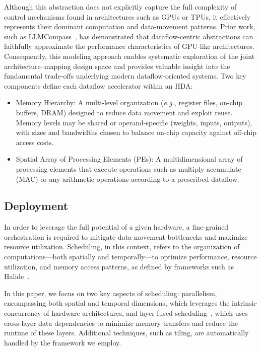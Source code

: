 \documentclass[lettersize,journal]{IEEEtran}
\begin{document}
Although this abstraction does not explicitly capture the full complexity of control mechanisms found in architectures such as GPUs or TPUs, it effectively represents their dominant computation and data-movement patterns. Prior work, such as LLMCompass~\cite{LLMCompass}, has demonstrated that dataflow-centric abstractions can faithfully approximate the performance characteristics of GPU-like architectures. Consequently, this modeling approach enables systematic exploration of the joint architecture–mapping design space and provides valuable insight into the fundamental trade-offs underlying modern dataflow-oriented systems.
Two key components define each dataflow accelerator within an HDA:
\begin{itemize}
    \item Memory Hierarchy: A multi-level organization (\emph{e.g.}, register files, on-chip buffers, DRAM) designed to reduce data movement and exploit reuse. Memory levels may be shared or operand-specific (weights, inputs, outputs), with sizes and bandwidths chosen to balance on-chip capacity against off-chip access costs.
    \item Spatial Array of Processing Elements (PEs): A multidimensional array of processing elements that execute operations such as multiply-accumulate (MAC) or any arithmetic operations according to a prescribed dataflow.
\end{itemize}

\subsection{Deployment}
In order to leverage the full potential of a given hardware, a fine-grained orchestration is required to mitigate data-movement bottlenecks and maximize resource utilization. Scheduling, in this context, refers to the organization of computations—both spatially and temporally—to optimize performance, resource utilization, and memory access patterns, as defined by frameworks such as Halide~\cite{halide2016}.

In this paper, we focus on two key aspects of scheduling: parallelism, encompassing both spatial and temporal dimensions, which leverages the intrinsic concurrency of hardware architectures, and layer-fused scheduling~\cite{alwani2016layerfused}, which uses cross-layer data dependencies to minimize memory transfers and reduce the runtime of these layers. Additional techniques, such as tiling, are automatically handled by the framework we employ.
\end{document}
